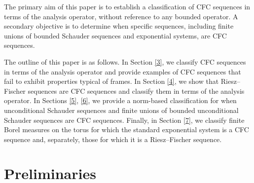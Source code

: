\documentclass[11pt]{amsart}
\theoremstyle{definition}
\numberwithin{equation}{section}
\begin{document}
The primary aim of this paper is to establish a classification of CFC sequences in terms of the analysis operator, without reference to any bounded operator. A secondary objective is to determine when specific sequences, including finite unions of bounded Schauder sequences and exponential systems, are CFC sequences.

The outline of this paper is as follows. In Section \ref{3}, we classify CFC sequences in terms of the analysis operator and provide examples of CFC sequences that fail to exhibit properties typical of frames. In Section \ref{4}, we show that Riesz–Fischer sequences are CFC sequences and classify them in terms of the analysis operator. In Sections \ref{5}, \ref{6}, we provide a norm-based classification for when unconditional Schauder sequences and finite unions of bounded unconditional Schauder sequences are CFC sequences. Finally, in Section \ref{7}, we classify finite Borel measures on the torus for which the standard exponential system is a CFC sequence and, separately, those for which it is a Riesz–Fischer sequence.

\section{Preliminaries}
\end{document}

